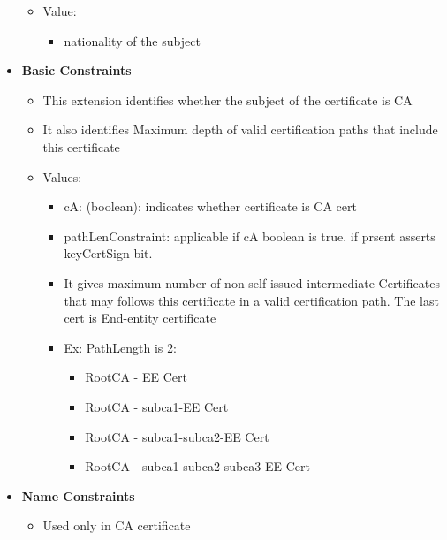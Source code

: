 \documentclass[a4paper]{article}
\begin{document}
\begin{itemize}
\begin{itemize}
                    \item Value:
                        \begin{itemize}
                            \item nationality of the subject
                        \end{itemize}
                \end{itemize}
            \item \textbf{Basic Constraints}
                \begin{itemize}
                    \item This extension identifies whether the subject of the certificate is CA 
                    \item It also identifies Maximum depth of valid certification paths that include this certificate
                    \item Values:
                        \begin{itemize}
                            \item cA: (boolean): indicates whether certificate is CA cert
                            \item pathLenConstraint: applicable if cA boolean is true. if prsent asserts keyCertSign bit. 
                            \item It gives maximum number of non-self-issued intermediate Certificates that may follows this certificate in a valid certification path. The last cert is End-entity certificate
                            \item Ex: PathLength is 2:
                                \begin{itemize}
                                    \item RootCA - EE Cert
                                    \item RootCA - subca1-EE Cert
                                    \item RootCA - subca1-subca2-EE Cert
                                    \item RootCA - subca1-subca2-subca3-EE Cert
                                \end{itemize}
                        \end{itemize}
                \end{itemize}
            \item \textbf{Name Constraints}
                \begin{itemize}
                    \item Used only in CA certificate

\end{itemize}
\end{itemize}
\end{document}
